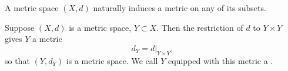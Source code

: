 \begin{comment}
Conversely one can show that a metric with these two additional properties does come from a norm, an exercise we leave to the reader. [Hint: the norm must arise as $\norm{v}=d(v,0)$.]
\end{remark}

We call a vector space endowed with a norm $\norm{\cdot}$ a \vocab{normed space}. Whenever we talk about normed spaces it is understood that we are also thinking of them as metric spaces, with the metric being defined by $d(v,w)=\norm{v-w}$.

Note that we do not assume that the underlying vector space $V$ is finite dimensional. Here are some examples which are not finite-dimensional (whilst we do not prove that they are not finite-dimensional here, it is not hard to do so and we suggest this as an exercise).

\begin{example}[$\ell^p$ spaces]
Let
\begin{align*}
\ell_1&=\crbrac{(x_n)_{n=1}^\infty\:\bigg|\:\sum_{n\ge1}|x_n|<\infty},\\
\ell_2&=\crbrac{(x_n)_{n=1}^\infty\:\bigg|\:\sum_{n\ge1}x_n^2<\infty},\\
\ell_\infty=&\crbrac{(x_n)_{n=1}^\infty\:\bigg|\:\sup_{n\in\NN}|x_n|<\infty}.
\end{align*}
The sets $\ell_1$, $\ell_2$, $\ell_\infty$ are all real vector spaces, and moreover
\begin{align*}
\norm{(x_n)}_1&=\sum_{n\ge1}|x_n|,\\
\norm{(x_n)}_2&=\brac{\sum_{n\ge1}x_n^2}^\frac{1}{2},\\
\norm{(x_n)}_\infty&=\sup_{n\in\NN}|x_n|
\end{align*}
define norms on $\ell_1$, $\ell_2$ and $\ell_\infty$ respectively.

Note that $\ell_2$ is in fact an inner product space where
\[\langle(x_n),(y_n)\rangle=\sum_{n\ge1}x_ny_n,\]
(the fact that the right-hand side converges if $(x_n)$ and $(y_n)$ are in $\ell_2$ follows from the Cauchy--Schwarz inequality). The space $\ell^2$ is known as \vocab{Hilbert space}.
\end{example}
\end{comment}

A metric space $(X,d)$ naturally induces a metric on any of its subsets.

\begin{definition}[Subspace]
Suppose $(X,d)$ is a metric space, $Y\subset X$. Then the restriction of $d$ to $Y\times Y$ gives $Y$ a metric
\[d_Y=d|_{Y\times Y},\]
so that $(Y,d_Y)$ is a metric space. We call $Y$ equipped with this metric a .
\end{definition}
\pagebreak

